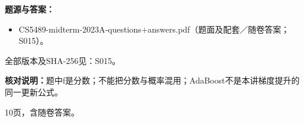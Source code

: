 \textbf{题源与答案：}

\begin{itemize}

\item CS5489-midterm-2023A-questions+answers.pdf（题面及配套／随卷答案；S015）。

\end{itemize}

全部版本及SHA-256见：S015。

\textbf{核对说明：}题中f是分数；不能把分数与概率混用；AdaBoost不是本讲梯度提升的同一更新公式。



10页，含随卷答案。

